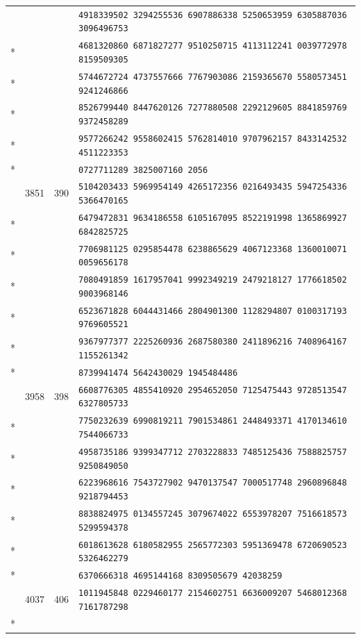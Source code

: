 \documentclass[10pt]{article}
\begin{document}
\begin{longtable}{@{}r@{\quad}r@{\quad}r@{\quad}l@{}}
 & &  & \texttt{4918339502 3294255536 6907886338 5250653959 6305887036 3096496753}\\*
 & &  & \texttt{4681320860 6871827277 9510250715 4113112241 0039772978 8159509305}\\*
 & &  & \texttt{5744672724 4737557666 7767903086 2159365670 5580573451 9241246866}\\*
 & &  & \texttt{8526799440 8447620126 7277880508 2292129605 8841859769 9372458289}\\*
 & &  & \texttt{9577266242 9558602415 5762814010 9707962157 8433142532 4511223353}\\*
 & &  & \texttt{0727711289 3825007160 2056}\\
\addlinespace[2pt]
80 & 3851 & 390 & \texttt{5104203433 5969954149 4265172356 0216493435 5947254336 5366470165}\\*
 & &  & \texttt{6479472831 9634186558 6105167095 8522191998 1365869927 6842825725}\\*
 & &  & \texttt{7706981125 0295854478 6238865629 4067123368 1360010071 0059656178}\\*
 & &  & \texttt{7080491859 1617957041 9992349219 2479218127 1776618502 9003968146}\\*
 & &  & \texttt{6523671828 6044431466 2804901300 1128294807 0100317193 9769605521}\\*
 & &  & \texttt{9367977377 2225260936 2687580380 2411896216 7408964167 1155261342}\\*
 & &  & \texttt{8739941474 5642430029 1945484486}\\
\addlinespace[2pt]
81 & 3958 & 398 & \texttt{6608776305 4855410920 2954652050 7125475443 9728513547 6327805733}\\*
 & &  & \texttt{7750232639 6990819211 7901534861 2448493371 4170134610 7544066733}\\*
 & &  & \texttt{4958735186 9399347712 2703228833 7485125436 7588825757 9250849050}\\*
 & &  & \texttt{6223968616 7543727902 9470137547 7000517748 2960896848 9218794453}\\*
 & &  & \texttt{8838824975 0134557245 3079674022 6553978207 7516618573 5299594378}\\*
 & &  & \texttt{6018613628 6180582955 2565772303 5951369478 6720690523 5326462279}\\*
 & &  & \texttt{6370666318 4695144168 8309505679 42038259}\\
\addlinespace[2pt]
82 & 4037 & 406 & \texttt{1011945848 0229460177 2154602751 6636009207 5468012368 7161787298}\\*

\end{longtable}
\end{document}

